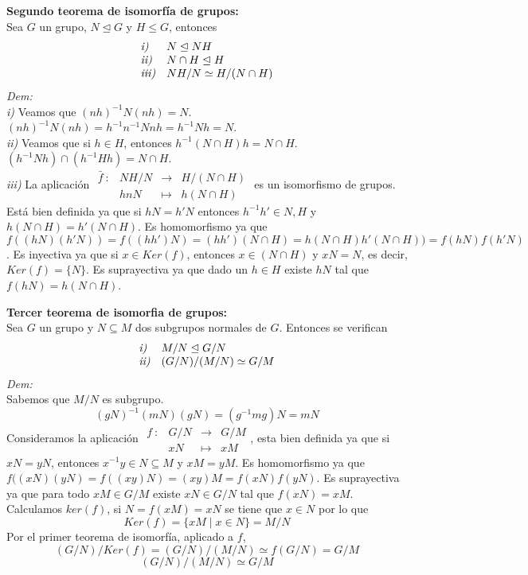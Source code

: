 \documentclass{article}
\begin{document}
\textbf{Segundo teorema de isomorfía de grupos:}\\
Sea $G$ un grupo, $N\trianglelefteq G$ y $H\le G$, entonces
$$
\begin{array}{ll}
    \text{\textit{i)}} & \text{$N\trianglelefteq NH$} \\
    \text{\textit{ii)}} &  \text{$N\cap H \trianglelefteq H$}\\
    \text{\textit{iii)}} & \text{$NH/N\simeq H/(N\cap H)$}
\end{array}
$$
\textit{Dem:}\\
\textit{i)} Veamos que $(nh)^{-1}N(nh)=N$. $(nh)^{-1}N(nh)=h^{-1}n^{-1}Nnh=h^{-1}Nh=N$.\\
\textit{ii)} Veamos que si $h \in H$, entonces $h^{-1}(N\cap H)h=N\cap H$. $(h^{-1}Nh)\cap(h^{-1}Hh)=N\cap H$.\\
\textit{iii)} La aplicación $
\begin{array}{cccc}
    \bar{f}\::&NH/N&\longrightarrow&H/(N\cap H)\\
        &hnN&\longmapsto&h(N\cap H)
\end{array}
$ es un isomorfismo de grupos. Está bien definida ya que si $hN=h'N$ entonces $h^{-1}h'\in N,H$ y $h(N\cap H)=h'(N\cap H)$. Es homomorfismo ya que $f((hN)(h'N))=f((hh')N) = (hh')(N\cap H)=h(N\cap H)h'(N\cap H))=f(hN)f(h'N)$. Es inyectiva ya que si $x\in Ker(f)$, entonces $x\in (N\cap H)$ y $xN=N$, es decir, $Ker(f)=\{N\}$. Es suprayectiva ya que dado un $h\in H$ existe $hN$ tal que $f(hN)=h(N\cap H)$.

\textbf{Tercer teorema de isomorfia de grupos:}\\
Sea $G$ un grupo y $N\subseteq M$ dos subgrupos normales de $G$. Entonces se verifican
$$
\begin{array}{ll}
    \text{\textit{i)}} & M/N \trianglelefteq G/N \\
    \text{\textit{ii)}} & (G/N)/(M/N)\simeq G/M
\end{array}
$$
\textit{Dem:}\\
Sabemos que $M/N$ es subgrupo.
$$
(gN)^{-1}(mN)(gN)=(g^{-1}mg)N=mN
$$
Consideramos la aplicación $\begin{array}{cccc}
    f\::&G/N&\longrightarrow&G/M\\
        &xN&\longmapsto&xM
\end{array}$, esta bien definida ya que si $xN=yN$, entonces $x^{-1}y\in N\subseteq M$ y $xM=yM$. Es homomorfismo ya que $f((xN)(yN)=f((xy)N)=(xy)M=f(xN)f(yN)$. Es suprayectiva ya que para todo $xM\in G/M$ existe $xN\in G/N$ tal que $f(xN)=xM$. Calculamos $ker(f)$, si $N=f(xM)=xN$ se tiene que $x\in N$ por lo que
$$
Ker(f)=\{xM\mid x\in N\}=M/N
$$
Por el primer teorema de isomorfía, aplicado a $f$,
$$
(G/N)/Ker(f)=(G/N)/(M/N)\simeq f(G/N)=G/M
$$
$$
(G/N)/(M/N)\simeq G/M
$$
\end{document}
